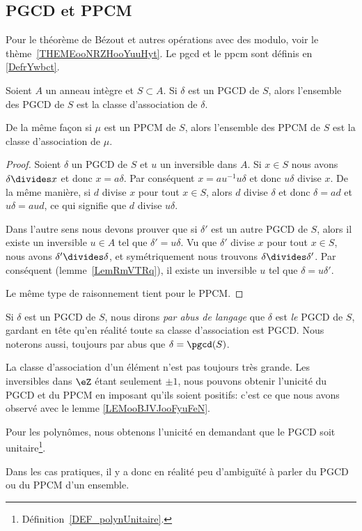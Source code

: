 \subsection{PGCD et PPCM}

Pour le théorème de Bézout et autres opérations avec des modulo, voir le thème~\ref{THEMEooNRZHooYuuHyt}. Le pgcd et le ppcm sont définis en \ref{DefrYwbct}.

\begin{lemma}
    Soient \( A\) un anneau intègre et \( S\subset A\). Si \( \delta\) est un PGCD de \( S\), alors l'ensemble des PGCD de \( S\) est la classe d'association de \( \delta\).

    De la même façon si \( \mu\) est un PPCM de \( S\), alors l'ensemble des PPCM de \( S\) est la classe d'association de \( \mu\).
\end{lemma}

\begin{proof}
    Soient \( \delta\) un PGCD de \( S\) et \( u\) un inversible dans \( A\). Si \( x\in S\) nous avons \( \delta\divides x\) et donc \( x=a\delta\). Par conséquent \( x=au^{-1}u\delta\) et donc \( u\delta\) divise \( x\). De la même manière, si \( d\) divise \( x\) pour tout \( x\in S\), alors \( d\) divise \( \delta\) et donc \( \delta=ad\) et \( u\delta=aud\), ce qui signifie que \( d\) divise \( u\delta\).

    Dans l'autre sens nous devons prouver que si \( \delta'\) est un autre PGCD de \( S\), alors il existe un inversible \( u\in A\) tel que \( \delta'=u\delta\). Vu que \( \delta'\) divise \( x\) pour tout \( x\in S\), nous avons \( \delta'\divides \delta\), et symétriquement nous trouvons \( \delta\divides\delta'\). Par conséquent (lemme~\ref{LemRmVTRq}), il existe un inversible \( u\) tel que \( \delta=u\delta'\).

    Le même type de raisonnement tient pour le PPCM.
\end{proof}

Si \( \delta\) est un PGCD de \( S\), nous dirons \emph{par abus de langage} que \( \delta\) est \emph{le} PGCD de \( S\), gardant en tête qu'en réalité toute sa classe d'association est PGCD. Nous noterons aussi, toujours par abus que \( \delta=\pgcd(S)\).

\begin{remark}
    La classe d'association d'un élément n'est pas toujours très grande. Les inversibles dans \( \eZ\) étant seulement \( \pm 1\), nous pouvons obtenir l'unicité du PGCD et du PPCM en imposant qu'ils soient positifs: c'est ce que nous avons observé avec le lemme \ref{LEMooBJVJooFyuFeN}.

    Pour les polynômes, nous obtenons l'unicité en demandant que le PGCD soit unitaire\footnote{Définition~\ref{DEF_polynUnitaire}.}.

    Dans les cas pratiques, il y a donc en réalité peu d'ambiguïté à parler du PGCD ou du PPCM d'un ensemble.
\end{remark}

